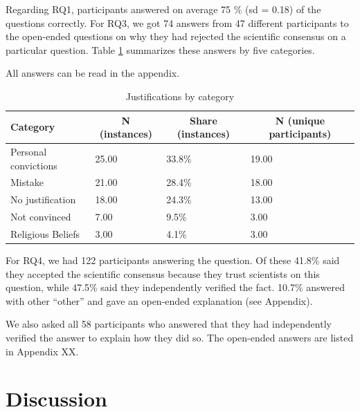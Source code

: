 \documentclass[
  doc,floatsintext]{apa6}
\begin{document}
Regarding RQ1, participants answered on average 75 \% (sd = 0.18) of the questions correctly. For RQ3, we got 74 answers from 47 different participants to the open-ended questions on why they had rejected the scientific consensus on a particular question. Table \ref{tab:exp3-justifications} summarizes these answers by five categories.

All answers can be read in the appendix.

\begin{table}[tbp]

\begin{center}
\begin{threeparttable}

\caption{\label{tab:exp3-justifications}Justifications by category}

\begin{tabular}{llll}
\toprule
Category & \multicolumn{1}{c}{N (instances)} & \multicolumn{1}{c}{Share (instances)} & \multicolumn{1}{c}{N (unique participants)}\\
\midrule
Personal convictions & 25.00 & 33.8\% & 19.00\\
Mistake & 21.00 & 28.4\% & 18.00\\
No justification & 18.00 & 24.3\% & 13.00\\
Not convinced & 7.00 & 9.5\% & 3.00\\
Religious Beliefs & 3.00 & 4.1\% & 3.00\\
\bottomrule
\end{tabular}

\end{threeparttable}
\end{center}

\end{table}

For RQ4, we had 122 participants answering the question. Of these 41.8\% said they accepted the scientific consensus because they trust scientists on this question, while 47.5\% said they independently verified the fact. 10.7\% answered with other ``other'' and gave an open-ended explanation (see Appendix).

We also asked all 58 participants who answered that they had independently verified the answer to explain how they did so. The open-ended answers are listed in Appendix XX.

\section{Discussion}\label{discussion-2}
\end{document}

